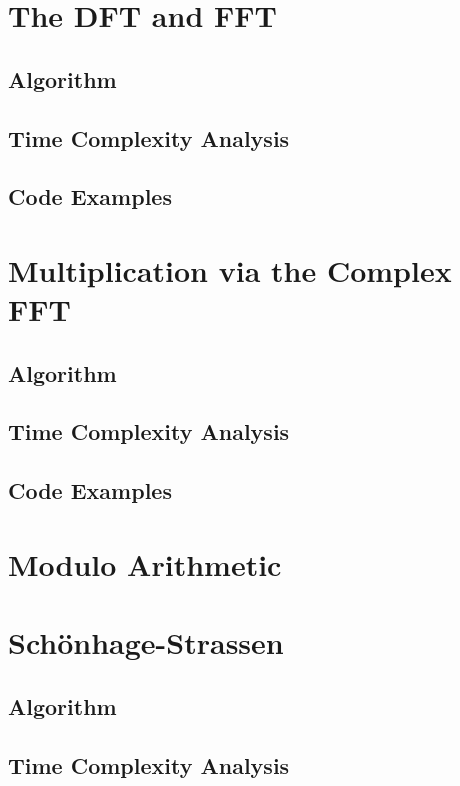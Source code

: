 \documentclass[psamsfonts,reqno]{amsart}
\theoremstyle{definition}
\theoremstyle{remark}
\numberwithin{equation}{section}
\begin{document}
\section{The DFT and FFT}

\subsection{Algorithm \nopunct}
\subsection{Time Complexity Analysis \nopunct}
\subsection{Code Examples \nopunct}

\section{Multiplication via the Complex FFT}

\subsection{Algorithm \nopunct}
\subsection{Time Complexity Analysis \nopunct}
\subsection{Code Examples \nopunct}

\section{Modulo Arithmetic}

\section{Sch\"{o}nhage-Strassen}

\subsection{Algorithm \nopunct}
\subsection{Time Complexity Analysis \nopunct}
\end{document}
